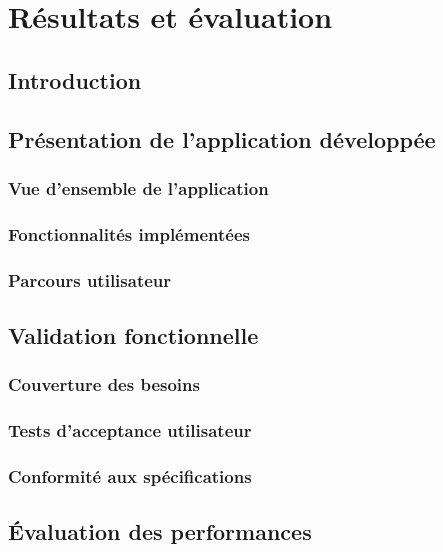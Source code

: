 \chapter{Résultats et évaluation}

\section{Introduction}

\section{Présentation de l'application développée}

\subsection{Vue d'ensemble de l'application}

\subsection{Fonctionnalités implémentées}

\subsection{Parcours utilisateur}

\section{Validation fonctionnelle}

\subsection{Couverture des besoins}

\subsection{Tests d'acceptance utilisateur}

\subsection{Conformité aux spécifications}

\section{Évaluation des performances}

